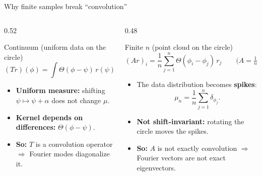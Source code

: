 \documentclass[10pt,aspectratio=169]{beamer}
\begin{document}
\begin{frame}{Why finite samples break ``convolution''}
	\small
	\begin{columns}[T,onlytextwidth]
		\begin{column}{0.52\textwidth}
			\begin{block}{Continuum (uniform data on the circle)}
				\[
					(Tr)(\phi)=\int \Theta(\phi-\psi)\,r(\psi)\,d\mu(\psi),
					\qquad d\mu(\psi)=\frac{d\psi}{2\pi}.
				\]
				\begin{itemize}
					\item \textbf{Uniform measure:} shifting $\psi\mapsto\psi+\alpha$ does not change $\mu$.
					\item \textbf{Kernel depends on differences:} $\Theta(\phi-\psi)$.
					\item \textbf{So:} $T$ is a \alert{convolution} operator $\Rightarrow$ Fourier modes diagonalize it.
				\end{itemize}
			\end{block}
		\end{column}

		\begin{column}{0.48\textwidth}
			\begin{block}{Finite $n$ (point cloud on the circle)}
				\[
					(Ar)_i=\frac1n\sum_{j=1}^n \Theta(\phi_i-\phi_j)\,r_j
					\qquad\Big(A=\tfrac1n K\Big).
				\]
				\begin{itemize}
					\item The data distribution becomes \textbf{spikes}:
					      \[
						      \mu_n=\frac1n\sum_{j=1}^n \delta_{\phi_j}.
					      \]
					\item \textbf{Not shift-invariant:} rotating the circle moves the spikes.
					\item \textbf{So:} $A$ is \alert{not exactly convolution} $\Rightarrow$ Fourier vectors are not exact eigenvectors.
				\end{itemize}
			\end{block}
		\end{column}
	\end{columns}

\end{frame}
\end{document}
